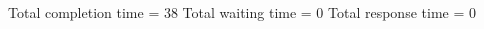\begin{RTGrid}[width=0.8\textwidth]{5}{20}
\end{RTGrid}\newline\newline
Total completion time = 38\newline
Total waiting time = 0\newline
Total response time = 0\newline
